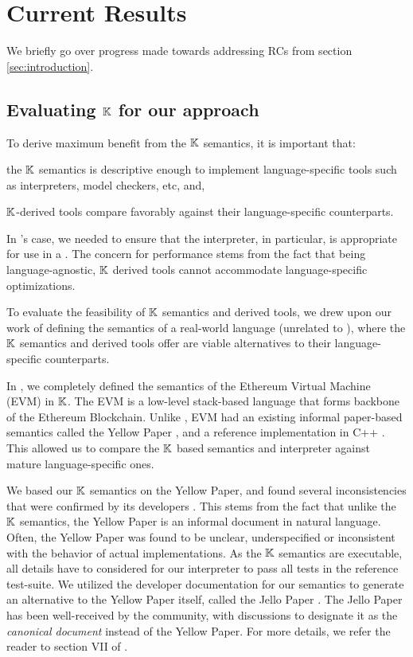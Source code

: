 \section{Current Results}

We briefly go over progress made towards addressing RCs from
section \ref{sec:introduction}.

\subsection{Evaluating $\mathbb{K}$ for our approach}

To derive maximum benefit from the $\mathbb{K}$ semantics, it is important that:
\begin{enumerate*}[label=(\roman*)]
  \item the $\mathbb{K}$ semantics is descriptive enough to implement language-specific
    tools such as interpreters, model checkers, etc, and,
  \item $\mathbb{K}$-derived tools compare favorably against their language-specific
    counterparts.
\end{enumerate*}
In \MediK{}'s case, we needed to ensure that the interpreter,
in particular, is appropriate for
use in a \CDSS{}. The concern for performance stems from the fact
that being language-agnostic, $\mathbb{K}{}$ derived tools
cannot accommodate language-specific optimizations.

To evaluate the feasibility of $\mathbb{K}$ semantics and derived tools, we
drew upon our work of defining the semantics of a real-world language
(unrelated to \MediK{}), where the $\mathbb{K}$ semantics and derived tools offer
are viable alternatives to their language-specific counterparts.

In \cite{HildenbrandtCSF18},
we completely defined the semantics of the Ethereum Virtual Machine (EVM)
in $\mathbb{K}{}$. The EVM is a low-level stack-based language
that forms backbone of the Ethereum Blockchain. Unlike \MediK{},
EVM had an existing informal paper-based semantics
called the Yellow Paper \cite{evmYellowpaperUrl},
and a reference implementation in C++ \cite{cppEthereumUrl}.
This allowed us to compare the $\mathbb{K}$ based semantics
and interpreter against mature language-specific ones.

We based our $\mathbb{K}$ semantics on the Yellow Paper, and
found several inconsistencies that were confirmed by its developers \cite{HildenbrandtCSF18}.
This stems from the fact that unlike the $\mathbb{K}$ semantics,
the Yellow Paper is an informal document in natural language.
Often, the Yellow Paper was found to be unclear, underspecified
or inconsistent with the behavior of actual implementations.
As the $\mathbb{K}$ semantics are executable, all details have to
considered for our interpreter to pass all tests in the reference
test-suite. We utilized the developer documentation for our semantics
to generate an alternative to the Yellow Paper itself, called the Jello Paper
\cite{evmJellopaperUrl}. The Jello Paper has been well-received by the
community, with discussions to designate it as the \emph{canonical document}
instead of the Yellow Paper. For more details, we refer the reader to
section VII of \cite{HildenbrandtCSF18}.

